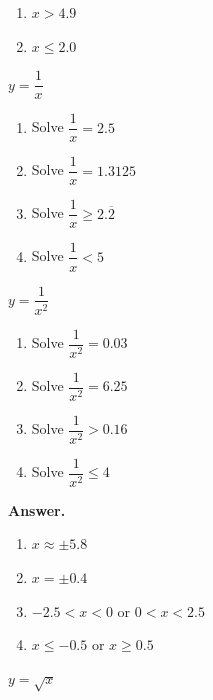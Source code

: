 \documentclass[10pt,]{book}
\theoremstyle{plain}
\theoremstyle{definition}
\theoremstyle{definition}
\theoremstyle{definition}
\theoremstyle{definition}
\numberwithin{equation}{part}
\newcommand{\lt}{<}
\newcommand{\gt}{>}
\begin{document}
\begin{exerciselist}
\begin{exercisegroup}
\begin{multicols}{2}
\begin{enumerate}[label=*\alph**]
\item\hypertarget{li-1583}{}\(x \gt 4.9\)%
\item\hypertarget{li-1584}{}\(x\le 2.0\)%
\end{enumerate}
\end{multicols}
%
\exercise[32.]\hypertarget{exercise-428}{}\(y=\dfrac{1}{x} \) \leavevmode%
\begin{multicols}{2}
\begin{enumerate}[label=*\alph**]
\item\hypertarget{li-1585}{}Solve \(\dfrac{1}{x} = 2.5\)%
\item\hypertarget{li-1586}{}Solve \(\dfrac{1}{x} = 1.3125\)%
\item\hypertarget{li-1587}{}Solve \(\dfrac{1}{x}\ge 2.\overline{2} \)%
\item\hypertarget{li-1588}{}Solve \(\dfrac{1}{x}\lt 5\)%
\end{enumerate}
\end{multicols}
%
\exercise[33.]\hypertarget{exercise-429}{}\(y=\dfrac{1}{x^2} \) \leavevmode%
\begin{multicols}{2}
\begin{enumerate}[label=*\alph**]
\item\hypertarget{li-1589}{}Solve \(\dfrac{1}{x^2} = 0.03\)%
\item\hypertarget{li-1590}{}Solve \(\dfrac{1}{x^2} = 6.25\)%
\item\hypertarget{li-1591}{}Solve \(\dfrac{1}{x^2}\gt 0.16 \)%
\item\hypertarget{li-1592}{}Solve \(\dfrac{1}{x^2}\le 4\)%
\end{enumerate}
\end{multicols}
%
\par\smallskip
\noindent\textbf{Answer.}\hypertarget{answer-238}{}\quad
\leavevmode%
\begin{multicols}{2}
\begin{enumerate}[label=*\alph**]
\item\hypertarget{li-1593}{}\(x\approx\pm 5.8 \)%
\item\hypertarget{li-1594}{}\(x = \pm 0.4\)%
\item\hypertarget{li-1595}{}\(-2.5\lt x \lt 0\) or \(0\lt x\lt 2.5\)%
\item\hypertarget{li-1596}{}\(x\le -0.5\) or \(x\ge 0.5\)%
\end{enumerate}
\end{multicols}
%
\exercise[34.]\hypertarget{exercise-430}{}\(y=\sqrt{x} \) \leavevmode%
\begin{multicols}{2}

\end{multicols}
\end{exercisegroup}
\end{exerciselist}
\end{document}
